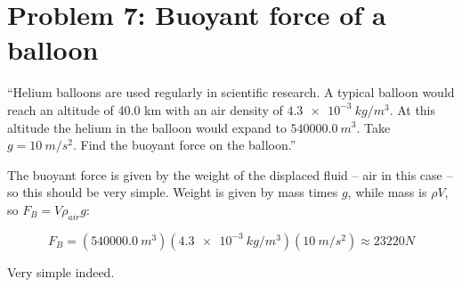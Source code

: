 \documentclass[8.01x]{subfiles}
\begin{document}
\section{Problem 7: Buoyant force of a balloon}

``Helium balloons are used regularly in scientific research. A typical balloon would reach an altitude of 40.0 km with an air density of $\SI{4.3e-3}{kg/m^3}$. At this altitude the helium in the balloon would expand to $\SI{540000.0}{m^3}$. Take $g = \SI{10}{m/s^2}$. Find the buoyant force on the balloon.''

The buoyant force is given by the weight of the displaced fluid -- air in this case -- so this should be very simple. Weight is given by mass times $g$, while mass is $\rho V$, so $F_B = V \rho_{air} g$:

\begin{equation}
F_B = (\SI{540000.0}{m^3})(\SI{4.3e-3}{kg/m^3})(\SI{10}{m/s^2}) \approx 23220 N
\end{equation}

Very simple indeed.
\end{document}
